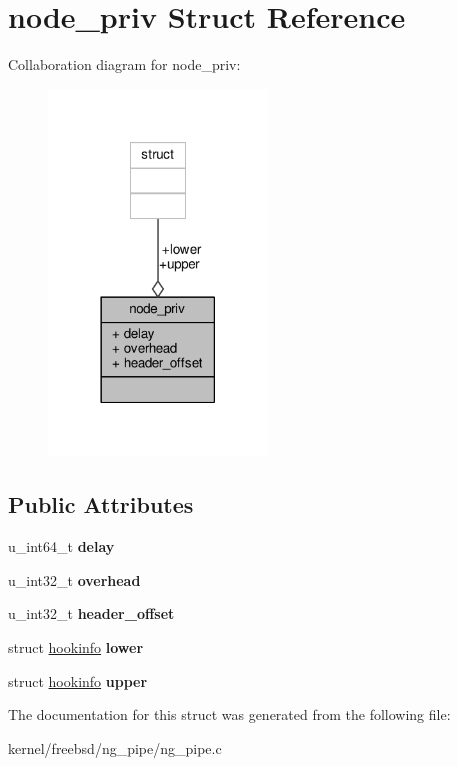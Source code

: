 \hypertarget{structnode__priv}{\section{node\+\_\+priv Struct Reference}
\label{structnode__priv}
}


Collaboration diagram for node\+\_\+priv\+:
\nopagebreak
\begin{figure}[H]
\begin{center}
\leavevmode
\includegraphics[width=165pt]{structnode__priv__coll__graph}
\end{center}
\end{figure}
\subsection*{Public Attributes}
\begin{DoxyCompactItemize}
\item 
\hypertarget{structnode__priv_a0542e10a68c872c9f17b633e5030b284}{u\+\_\+int64\+\_\+t {\bfseries delay}}\label{structnode__priv_a0542e10a68c872c9f17b633e5030b284}

\item 
\hypertarget{structnode__priv_a05935c6f905f0401fab6a3549f6d69fc}{u\+\_\+int32\+\_\+t {\bfseries overhead}}\label{structnode__priv_a05935c6f905f0401fab6a3549f6d69fc}

\item 
\hypertarget{structnode__priv_aeef9668e9daee8fa287ec8cbdda94078}{u\+\_\+int32\+\_\+t {\bfseries header\+\_\+offset}}\label{structnode__priv_aeef9668e9daee8fa287ec8cbdda94078}

\item 
\hypertarget{structnode__priv_a0d5b7680e2a11797ce25f28159770e34}{struct \hyperlink{structhookinfo}{hookinfo} {\bfseries lower}}\label{structnode__priv_a0d5b7680e2a11797ce25f28159770e34}

\item 
\hypertarget{structnode__priv_af288dfa388c8682ae2a7e22e2b8280c1}{struct \hyperlink{structhookinfo}{hookinfo} {\bfseries upper}}\label{structnode__priv_af288dfa388c8682ae2a7e22e2b8280c1}

\end{DoxyCompactItemize}


The documentation for this struct was generated from the following file\+:\begin{DoxyCompactItemize}
\item 
kernel/freebsd/ng\+\_\+pipe/ng\+\_\+pipe.\+c\end{DoxyCompactItemize}
